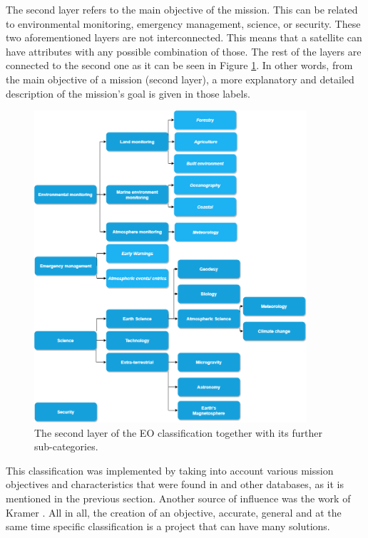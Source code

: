 The second layer refers to the main objective of the mission. This can be related to environmental monitoring, emergency management, science, or security. These two aforementioned layers are not interconnected. This means that a satellite can have attributes with any possible combination of those. The rest of the layers are connected to the second one as it can be seen in Figure \ref{classification_2nd_layer}. In other words, from the main objective of a mission (second layer), a more explanatory and detailed description of the mission's goal is given in those labels.

\begin{figure}[!htb]
\centering
\includegraphics[width=0.9\textwidth]{Images/classification_2nd_layer.png}\caption{The second layer of the EO classification together with its further sub-categories.}
\label{classification_2nd_layer}
\end{figure}

This classification was implemented by taking into account various mission objectives and characteristics that were found in \cite{Newspace} and other databases, as it is mentioned in the previous section. Another source of influence was the work of Kramer \cite{Kramer 2002}. All in all, the creation of an objective, accurate, general and at the same time specific classification is a project that can have many solutions.


